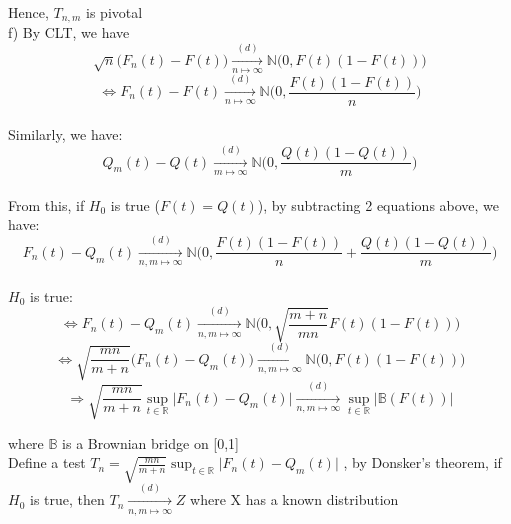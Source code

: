\documentclass[10pt]{article}
\newenvironment{problem}[2][Problem]{\begin{trivlist}
\item[\hskip \labelsep {\bfseries #1}\hskip \labelsep {\bfseries #2.}]}{\end{trivlist}}
\begin{document}
\begin{problem}{2}
Hence, $T_{n,m}$ is pivotal\\
f) By CLT, we have
\[\sqrt{n}\big(F_n(t)-F(t)\big) \xrightarrow[n \mapsto\infty ]{(d)}  \mathbb{N}\big(0, F(t)(1-F(t)) \big) \]
\[\Leftrightarrow F_n(t)-F(t)\xrightarrow[n \mapsto\infty ]{(d)} \mathbb{N}\big(0,\frac{F(t)(1-F(t))}{n}  \big) \]\\

Similarly, we have:
\[Q_m(t)-Q(t)\xrightarrow[m \mapsto\infty ]{(d)} \mathbb{N}\big(0,\frac{Q(t)(1-Q(t))}{m}  \big) \]\\

From this, if $H_0$ is true ($F(t)=Q(t)$),  by subtracting 2 equations above, we have:
\[F_n(t)-Q_m(t) \xrightarrow[n,m \mapsto\infty ]{(d)} \mathbb{N}\big(0, \frac{F(t)(1-F(t))}{n} +\frac{Q(t)(1-Q(t))}{m}  \big)\]\\

$H_0 $ is true:
\[\Leftrightarrow  F_n(t)-Q_m(t)  \xrightarrow[n,m \mapsto\infty ]{(d)} \mathbb{N}\big(0,\sqrt{\frac{m+n}{mn}}F(t)(1-F(t)) \big)\]
\[\Leftrightarrow \sqrt{\frac{mn}{m+n}}\big( F_n(t)-Q_m(t) \big)  \xrightarrow[n,m \mapsto\infty ]{(d)} \mathbb{N}\big(0,F(t)(1-F(t)) \big)\]
\[\Rightarrow\sqrt{\frac{mn}{m+n}} \sup_{t\in \mathbb{R}}\big| F_n(t)-Q_m(t) \big|  \xrightarrow[n,m \mapsto\infty ]{(d)} \sup_{t\in \mathbb{R}} \big|\mathbb{B}(F(t))\big| \]

where $\mathbb{B}$ is a Brownian bridge on [0,1]\\

Define a test $T_n=\sqrt{\frac{mn}{m+n}} \sup_{t\in \mathbb{R}}\big| F_n(t)-Q_m(t) \big| $ , by Donsker's theorem, if $H_0$ is true, then $T_n \xrightarrow[n,m \mapsto\infty ]{(d)} Z$ where X has a known distribution


\end{problem}
\end{document}

